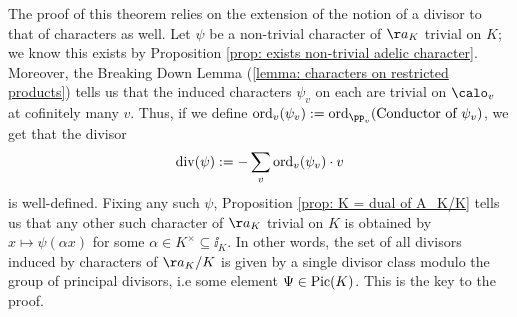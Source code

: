 \documentclass[11pt, x11names, openany]{book}
\begin{document}
The proof of this theorem relies on the extension of the notion of a divisor to that of characters as well. Let $\psi$ be a non-trivial character of $\aa_K$ trivial on $K$; we know this exists by Proposition \ref{prop: exists non-trivial adelic character}. Moreover, the Breaking Down Lemma (\ref{lemma: characters on restricted products}) tells us that the induced characters $\psi_v$ on each are trivial on $\calo_v$ at cofinitely many $v$. Thus, if we define $\ord_v(\psi_v) := \ord_{\pp_v}(\text{Conductor of } \psi_v)$, we get that the divisor
\begin{equation}
    \label{eqn: divisor of a character}
    \operatorname{div}(\psi) := - \sum_v \operatorname{ord}_v(\psi_v) \cdot v
\end{equation}
is well-defined. Fixing any such $\psi$, Proposition \ref{prop: K = dual of A_K/K} tells us that any other such character of $\aa_K$ trivial on $K$ is obtained by $x \mapsto \psi(\alpha x)$ for some $\alpha \in K^\times \subseteq \ii_K$. In other words, the set of all divisors induced by characters of $\aa_K/K$ is given by a single divisor class modulo the group of principal divisors, i.e some element $\Psi \in \operatorname{Pic}(K)$. This is the key to the proof.
\end{document}
